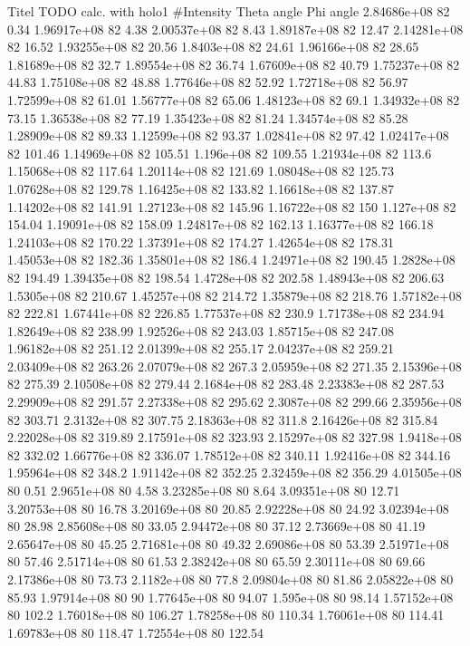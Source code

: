 Titel TODO
calc. with holo1
#Intensity    Theta angle    Phi angle
2.84686e+08 82 0.34
1.96917e+08 82 4.38
2.00537e+08 82 8.43
1.89187e+08 82 12.47
2.14281e+08 82 16.52
1.93255e+08 82 20.56
1.8403e+08 82 24.61
1.96166e+08 82 28.65
1.81689e+08 82 32.7
1.89554e+08 82 36.74
1.67609e+08 82 40.79
1.75237e+08 82 44.83
1.75108e+08 82 48.88
1.77646e+08 82 52.92
1.72718e+08 82 56.97
1.72599e+08 82 61.01
1.56777e+08 82 65.06
1.48123e+08 82 69.1
1.34932e+08 82 73.15
1.36538e+08 82 77.19
1.35423e+08 82 81.24
1.34574e+08 82 85.28
1.28909e+08 82 89.33
1.12599e+08 82 93.37
1.02841e+08 82 97.42
1.02417e+08 82 101.46
1.14969e+08 82 105.51
1.196e+08 82 109.55
1.21934e+08 82 113.6
1.15068e+08 82 117.64
1.20114e+08 82 121.69
1.08048e+08 82 125.73
1.07628e+08 82 129.78
1.16425e+08 82 133.82
1.16618e+08 82 137.87
1.14202e+08 82 141.91
1.27123e+08 82 145.96
1.16722e+08 82 150
1.127e+08 82 154.04
1.19091e+08 82 158.09
1.24817e+08 82 162.13
1.16377e+08 82 166.18
1.24103e+08 82 170.22
1.37391e+08 82 174.27
1.42654e+08 82 178.31
1.45053e+08 82 182.36
1.35801e+08 82 186.4
1.24971e+08 82 190.45
1.2828e+08 82 194.49
1.39435e+08 82 198.54
1.4728e+08 82 202.58
1.48943e+08 82 206.63
1.5305e+08 82 210.67
1.45257e+08 82 214.72
1.35879e+08 82 218.76
1.57182e+08 82 222.81
1.67441e+08 82 226.85
1.77537e+08 82 230.9
1.71738e+08 82 234.94
1.82649e+08 82 238.99
1.92526e+08 82 243.03
1.85715e+08 82 247.08
1.96182e+08 82 251.12
2.01399e+08 82 255.17
2.04237e+08 82 259.21
2.03409e+08 82 263.26
2.07079e+08 82 267.3
2.05959e+08 82 271.35
2.15396e+08 82 275.39
2.10508e+08 82 279.44
2.1684e+08 82 283.48
2.23383e+08 82 287.53
2.29909e+08 82 291.57
2.27338e+08 82 295.62
2.3087e+08 82 299.66
2.35956e+08 82 303.71
2.3132e+08 82 307.75
2.18363e+08 82 311.8
2.16426e+08 82 315.84
2.22028e+08 82 319.89
2.17591e+08 82 323.93
2.15297e+08 82 327.98
1.9418e+08 82 332.02
1.66776e+08 82 336.07
1.78512e+08 82 340.11
1.92416e+08 82 344.16
1.95964e+08 82 348.2
1.91142e+08 82 352.25
2.32459e+08 82 356.29
4.01505e+08 80 0.51
2.9651e+08 80 4.58
3.23285e+08 80 8.64
3.09351e+08 80 12.71
3.20753e+08 80 16.78
3.20169e+08 80 20.85
2.92228e+08 80 24.92
3.02394e+08 80 28.98
2.85608e+08 80 33.05
2.94472e+08 80 37.12
2.73669e+08 80 41.19
2.65647e+08 80 45.25
2.71681e+08 80 49.32
2.69086e+08 80 53.39
2.51971e+08 80 57.46
2.51714e+08 80 61.53
2.38242e+08 80 65.59
2.30111e+08 80 69.66
2.17386e+08 80 73.73
2.1182e+08 80 77.8
2.09804e+08 80 81.86
2.05822e+08 80 85.93
1.97914e+08 80 90
1.77645e+08 80 94.07
1.595e+08 80 98.14
1.57152e+08 80 102.2
1.76018e+08 80 106.27
1.78258e+08 80 110.34
1.76061e+08 80 114.41
1.69783e+08 80 118.47
1.72554e+08 80 122.54
